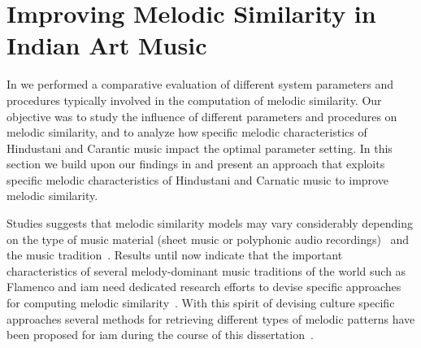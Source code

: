\section{Improving Melodic Similarity in Indian Art Music}
\label{sec:patterns_improving_melodic_similarity}

In  we performed a comparative evaluation of different system parameters and procedures typically involved in the computation of melodic similarity. Our objective was to study the influence of different parameters and procedures on melodic similarity, and to analyze how specific melodic  characteristics of Hindustani and Carantic music impact the optimal parameter setting. In this section we build upon our findings in  and present an approach that exploits specific melodic characteristics of Hindustani and Carnatic music to improve melodic similarity. 

Studies suggests that melodic similarity models may vary considerably depending on the type of music material (sheet music or polyphonic audio recordings)~\citep{Marsden2012, collins2014bridging, ghias1995query} and the music tradition~\citep{Juhasz2009a, Conklin2010a}. Results until now indicate that the important characteristics of several melody-dominant music traditions of the world such as Flamenco and \gls{iam} need dedicated research efforts to devise specific approaches for computing melodic similarity~\citep{pikrakis2012tracking,Rao2014}. With this spirit of devising culture specific approaches several methods for retrieving different types of melodic patterns have been proposed for \gls{iam} during the course of this dissertation~\citep{Ross2012b,Ross2012,ishwar2012motivic,Rao2014,Ishwar2013,Dutta2014}. 

